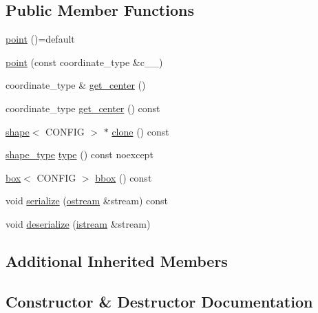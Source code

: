 \subsection*{Public Member Functions}
\begin{DoxyCompactItemize}
\item 
\hyperlink{classmui_1_1geometry_1_1point_a5d3396395b127b4a6791014667b7a21d}{point} ()=default
\item 
\hyperlink{classmui_1_1geometry_1_1point_a97c421465c3aa63bccc7ae981c27c57d}{point} (const coordinate\+\_\+type \&c\+\_\+\+\_\+)
\item 
coordinate\+\_\+type \& \hyperlink{classmui_1_1geometry_1_1point_a4aafb0c40d083c9a8f157f534b09dc49}{get\+\_\+center} ()
\item 
coordinate\+\_\+type \hyperlink{classmui_1_1geometry_1_1point_aef6da89faebae94031a07848314f7cfb}{get\+\_\+center} () const
\item 
\hyperlink{classmui_1_1geometry_1_1shape}{shape}$<$ C\+O\+N\+F\+IG $>$ $\ast$ \hyperlink{classmui_1_1geometry_1_1point_ab6e1db8a0e4c6bf07baa31d3e03b0e9c}{clone} () const
\item 
\hyperlink{namespacemui_1_1geometry_a5f311a343181e2f20482e5c9afb0f136}{shape\+\_\+type} \hyperlink{classmui_1_1geometry_1_1point_ad8984905be09323d1e8d9189fc4a099f}{type} () const noexcept
\item 
\hyperlink{classmui_1_1geometry_1_1box}{box}$<$ C\+O\+N\+F\+IG $>$ \hyperlink{classmui_1_1geometry_1_1point_ac858e6315e18e6e2a16166e4db748e32}{bbox} () const
\item 
void \hyperlink{classmui_1_1geometry_1_1point_aebeb572c611a8179a16e9a8ecd8b9e61}{serialize} (\hyperlink{classmui_1_1ostream}{ostream} \&stream) const
\item 
void \hyperlink{classmui_1_1geometry_1_1point_ad51109c7b96af086ac9a7cb5422a5d2e}{deserialize} (\hyperlink{classmui_1_1istream}{istream} \&stream)
\end{DoxyCompactItemize}
\subsection*{Additional Inherited Members}


\subsection{Constructor \& Destructor Documentation}
\mbox{\label{classmui_1_1geometry_1_1point_a5d3396395b127b4a6791014667b7a21d}} 
